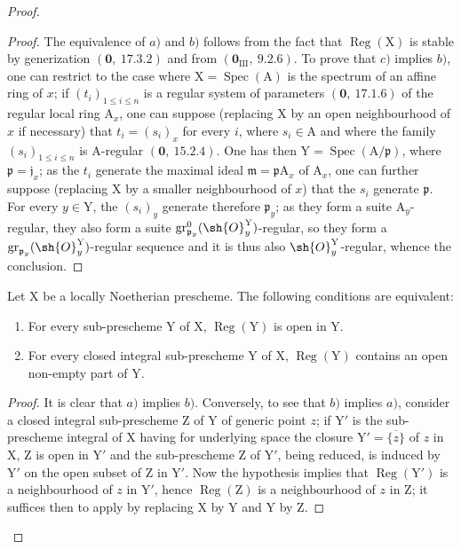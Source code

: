 \begin{proof}
\begin{proof}
The equivalence of $a)$ and $b)$ follows from the fact that $\operatorname{Reg}(\mathrm{X})$ is stable by generization
$(\mathbf{0},~17.3.2)$ and from $(\mathbf{0}_{\mathrm{III}},~9.2.6)$. To prove that $c)$ implies $b)$, one can restrict to the
case where $\mathrm{X}=\operatorname{Spec}(\mathrm{A})$ is the spectrum of an affine ring of $x$; if $(t_i)_{1\leqslant i\leqslant n}$ is a regular
system of parameters $(\mathbf{0},~17.1.6)$ of the regular local ring $\mathrm{A}_x$, one can suppose
(replacing $\mathrm{X}$ by an open neighbourhood of $x$ if necessary) that $t_i=(s_i)_x$ for every $i$,
where $s_i\in\mathrm{A}$ and where the family $(s_i)_{1\leqslant i\leqslant n}$ is $\mathrm{A}$-regular $(\mathbf{0},~15.2.4)$. One has then $\mathrm{Y}=\operatorname{Spec}(\mathrm{A}/\mathfrak{p})$,
where $\mathfrak{p}=\mathfrak{j}_x$; as the $t_i$ generate the maximal ideal $\mathfrak{m}=\mathfrak{p}\mathrm{A}_x$ of $\mathrm{A}_x$, one can further
suppose (replacing $\mathrm{X}$ by a smaller neighbourhood of $x$) that the $s_i$ generate $\mathfrak{p}$.
For every $y\in\mathrm{Y}$, the $(s_i)_y$ generate therefore $\mathfrak{p}_y$; as they form a suite $\mathrm{A}_y$-regular,
they also form a suite $\operatorname{gr}^0_{\mathfrak{p}_y}(\sh{O}^{\mathrm{Y}}_y)$-regular, so they form a
$\operatorname{gr}_{\mathfrak{p}_y}(\sh{O}^{\mathrm{Y}}_y)$-regular sequence and it is thus also $\sh{O}^{\mathrm{Y}}_y$-regular,
whence the conclusion.
\end{proof}

\begin{corollary}[6.12.3]
\label{IV.6.12.3}
Let $\mathrm{X}$ be a locally Noetherian prescheme. The following conditions
are equivalent:
\begin{enumerate}[label=\emph{\alph*)}]
  \item For every sub-prescheme $\mathrm{Y}$ of $\mathrm{X}$, $\operatorname{Reg}(\mathrm{Y})$ is open in $\mathrm{Y}$.
  \item For every closed integral sub-prescheme $\mathrm{Y}$ of $\mathrm{X}$, $\operatorname{Reg}(\mathrm{Y})$ contains an open non-empty
part of $\mathrm{Y}$.
\end{enumerate}
\end{corollary}

\begin{proof}
It is clear that $a)$ implies $b)$. Conversely, to see that $b)$ implies $a)$, consider
a closed integral sub-prescheme $\mathrm{Z}$ of $\mathrm{Y}$ of generic point $z$; if $\mathrm{Y}'$ is the
sub-prescheme integral of $\mathrm{X}$ having for underlying space the closure $\mathrm{Y}'=\overline{\{z\}}$ of $z$
in $\mathrm{X}$, $\mathrm{Z}$ is open in $\mathrm{Y}'$ and the sub-prescheme $\mathrm{Z}$ of $\mathrm{Y}'$, being reduced, is induced by $\mathrm{Y}'$
on the open subset of $\mathrm{Z}$ in $\mathrm{Y}'$. Now the hypothesis implies that $\operatorname{Reg}(\mathrm{Y}')$ is
a neighbourhood of $z$ in $\mathrm{Y}'$, hence $\operatorname{Reg}(\mathrm{Z})$ is a neighbourhood of $z$ in $\mathrm{Z}$; it suffices then
to apply  by replacing $\mathrm{X}$ by $\mathrm{Y}$ and $\mathrm{Y}$ by $\mathrm{Z}$.
\end{proof}


\end{proof}
